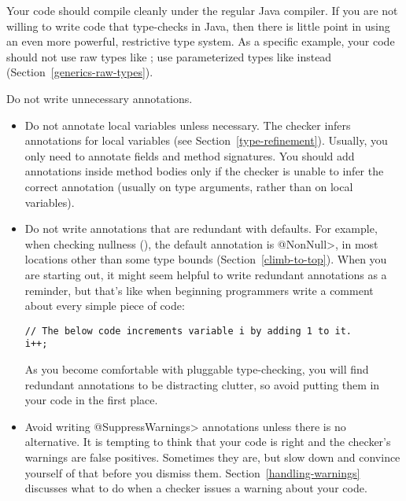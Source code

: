 Your code should compile cleanly under the regular Java compiler.  If you
are not willing to write code that type-checks in Java, then there is
little point in using an even more powerful, restrictive type system.  As a
specific example, your code should not use raw types like ; use
parameterized types like  instead
(Section~\ref{generics-raw-types}).

Do not write unnecessary annotations.
\begin{itemize}
\item
  Do not annotate local variables unless necessary.  The checker infers
  annotations for local variables (see Section~\ref{type-refinement}).
  Usually, you only need to annotate fields and method signatures.  You
  should add annotations inside method bodies only if the checker is unable
  to infer the correct annotation (usually on type arguments, rather than
  on local variables).

\item
  Do not write annotations that are redundant with defaults.  For example,
  when checking nullness (), the default
  annotation is \<@NonNull>, in most locations other than some type bounds
  (Section~\ref{climb-to-top}).  When you are starting out, it might seem
  helpful to write redundant annotations as a reminder, but that's like
  when beginning programmers write a comment about every simple piece of
  code:

\begin{Verbatim}
// The below code increments variable i by adding 1 to it.
i++;
\end{Verbatim}

  As you become comfortable with pluggable type-checking, you will find
  redundant annotations to be distracting clutter, so avoid putting them in
  your code in the first place.

\item
  Avoid writing \<@SuppressWarnings> annotations unless there is no
  alternative.  It is tempting to think that your code is right and the
  checker's warnings are false positives.  Sometimes they are, but slow
  down and convince yourself of that before you dismiss them.
  Section~\ref{handling-warnings} discusses what to do when a checker
  issues a warning about your code.

\end{itemize}


